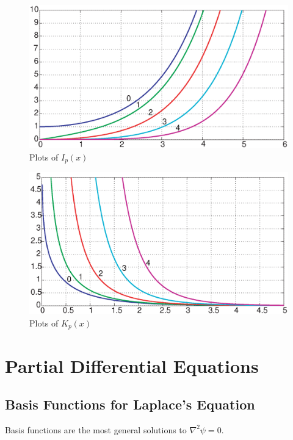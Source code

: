 \begin{figure}[h!!]
  \centering
  \includegraphics[scale=.45]{figures/modifiedbesselfirstkind.eps}
  \caption*{\small Plots of $I_{p}(x)$ }
\end{figure}

\begin{figure}[h!!]
  \centering
  \includegraphics[scale=.45]{figures/modifiedbesselsecondkind.eps}
  \caption*{\small Plots of $K_{p}(x)$}
\end{figure}

\section{Partial Differential Equations}

\subsection{Basis Functions for Laplace's Equation}
Basis functions are the most general solutions to $\nabla^2\psi=0$. \cite{parker}

